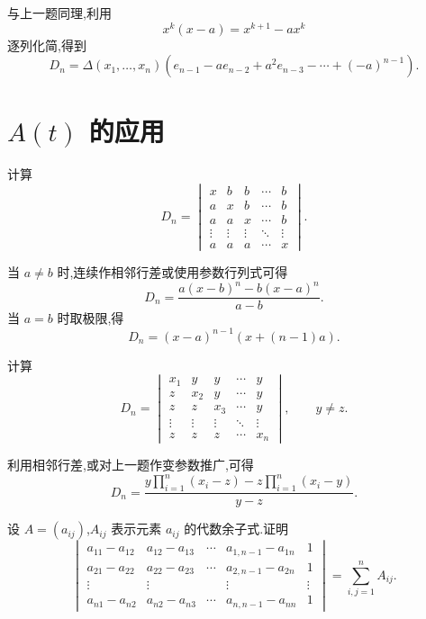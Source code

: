 \begin{solution}
与上一题同理,利用
\[
x^k(x-a)=x^{k+1}-ax^k
\]
逐列化简,得到
\[
\boxed{
D_n
=
\Delta(x_1,\ldots,x_n)
\left(
e_{n-1}
-ae_{n-2}
+a^2e_{n-3}
-\cdots
+(-a)^{n-1}
\right)
}.
\]
\end{solution}


\newpage

\section{\texorpdfstring{$A(t)$}{A(t)} 的应用}

\begin{example}
计算
\[
D_n=
\begin{vmatrix}
x&b&b&\cdots&b\\
a&x&b&\cdots&b\\
a&a&x&\cdots&b\\
\vdots&\vdots&\vdots&\ddots&\vdots\\
a&a&a&\cdots&x
\end{vmatrix}.
\]
\end{example}
\exampleblank

\begin{solution}
当 $a\neq b$ 时,连续作相邻行差或使用参数行列式可得
\[
\boxed{
D_n
=
\dfrac{
a(x-b)^n-b(x-a)^n
}{a-b}
}.
\]
当 $a=b$ 时取极限,得
\[
\boxed{
D_n
=
(x-a)^{n-1}\left(x+(n-1)a\right)
}.
\]
\end{solution}


\begin{example}
计算
\[
D_n=
\begin{vmatrix}
x_1&y&y&\cdots&y\\
z&x_2&y&\cdots&y\\
z&z&x_3&\cdots&y\\
\vdots&\vdots&\vdots&\ddots&\vdots\\
z&z&z&\cdots&x_n
\end{vmatrix},
\qquad
y\neq z.
\]
\end{example}
\exampleblank

\begin{solution}
利用相邻行差,或对上一题作变参数推广,可得
\[
\boxed{
D_n
=
\dfrac{
\displaystyle y\prod\limits_{i=1}^{n}(x_i-z)
-
z\prod\limits_{i=1}^{n}(x_i-y)
}{y-z}
}.
\]
\end{solution}


\begin{example}
设 $A=(a_{ij})$,$A_{ij}$ 表示元素 $a_{ij}$ 的代数余子式.证明
\[
\begin{vmatrix}
a_{11}-a_{12}&a_{12}-a_{13}&\cdots&a_{1,n-1}-a_{1n}&1\\
a_{21}-a_{22}&a_{22}-a_{23}&\cdots&a_{2,n-1}-a_{2n}&1\\
\vdots&\vdots&&\vdots&\vdots\\
a_{n1}-a_{n2}&a_{n2}-a_{n3}&\cdots&a_{n,n-1}-a_{nn}&1
\end{vmatrix}
=
\sum\limits_{i,j=1}^{n}A_{ij}.
\]
\end{example}
\exampleblank


